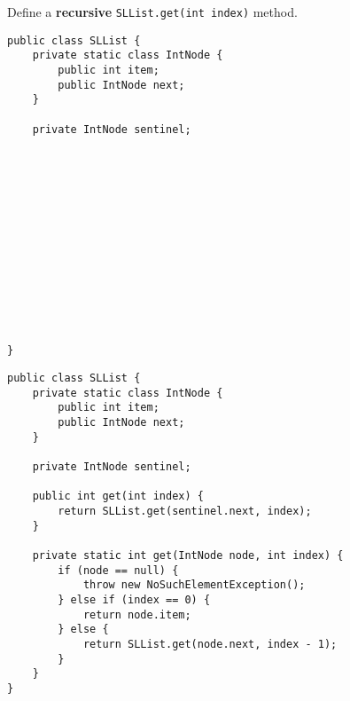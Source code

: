 \question Define a \textbf{recursive} \texttt{SLList.get(int index)} method.

\ifprintanswers
\else
\begin{lstlisting}
public class SLList {
    private static class IntNode {
        public int item;
        public IntNode next;
    }

    private IntNode sentinel;














}
\end{lstlisting}
\fi

\begin{solution}
\begin{lstlisting}
public class SLList {
    private static class IntNode {
        public int item;
        public IntNode next;
    }

    private IntNode sentinel;

    public int get(int index) {
        return SLList.get(sentinel.next, index);
    }

    private static int get(IntNode node, int index) {
        if (node == null) {
            throw new NoSuchElementException();
        } else if (index == 0) {
            return node.item;
        } else {
            return SLList.get(node.next, index - 1);
        }
    }
}
\end{lstlisting}
\end{solution}
